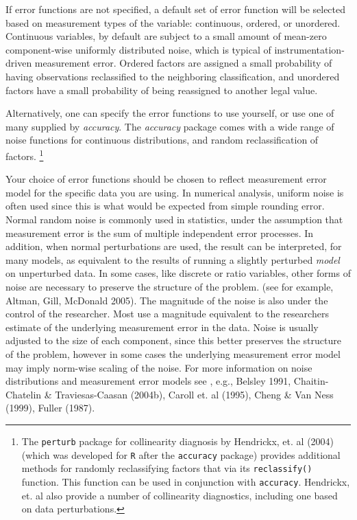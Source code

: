 \documentclass[11pt]{article}
\begin{document}
If error functions are not specified, a default  set of error function will be 
selected based on measurement types of the variable: continuous, ordered, or unordered.
Continuous variables, by default are subject to a small amount of
 mean-zero component-wise uniformly distributed
noise, which is typical of instrumentation-driven measurement error. Ordered factors
are assigned a small probability of having observations reclassified to the neighboring classification,
and unordered factors have a small probability of being reassigned to another legal value.

Alternatively, one can specify the error functions to use yourself, or use one of many
supplied by \emph{accuracy}.  The \emph{accuracy} package comes with a wide range 
of noise functions for continuous distributions,  and random reclassification of factors. 
\footnote{The \texttt{perturb} package for collinearity diagnosis by Hendrickx, et. al (2004) (which was
developed for \texttt{R} after the \texttt{accuracy} package) provides additional
methods for randomly reclassifying factors that via its \texttt{reclassify()} function. 
This function can be used in conjunction with \texttt{accuracy}. 
Hendrickx, et. al also provide a number of collinearity 
diagnostics, including one based on data perturbations. } 

Your choice of error functions should be chosen to reflect measurement error model for the specific
data you are using. In numerical analysis,  uniform noise  is often used since this is what would be
expected from  simple rounding error.  Normal random noise is commonly used in statistics,
under the assumption that measurement error is the sum of multiple independent error processes. In 
addition, when normal perturbations are used, the result can be interpreted, for many models, as equivalent
to the results of running a slightly perturbed \emph{model} on unperturbed data.  In some cases,
like discrete or ratio variables, other forms of noise are necessary to preserve
the structure of the problem. (see for example, Altman, Gill, McDonald 2005). 
The magnitude of the noise is also under the control of the researcher. Most
use a magnitude equivalent to the researchers estimate of the underlying measurement error in the data.
Noise is usually adjusted to the size of each component, since this better
preserves the structure of the problem, however in some cases the underlying
measurement error model may imply norm-wise scaling of the noise. For more
information on noise distributions and measurement error models see , e.g., 
Belsley 1991, Chaitin-Chatelin \& Traviesas-Caasan  (2004b), Caroll et. al (1995), Cheng \& Van Ness (1999), Fuller (1987).
\end{document}
